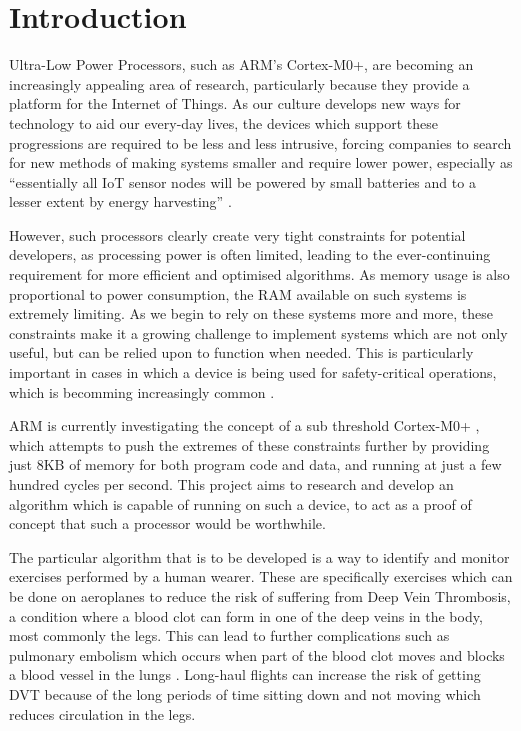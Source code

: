 \chapter{Introduction}

Ultra-Low Power Processors, such as ARM's Cortex-M0+, are becoming an increasingly appealing area of research, particularly because they provide a platform for the Internet of Things. As our culture develops new ways for technology to aid our every-day lives, the devices which support these progressions are required to be less and less intrusive, forcing companies to search for new methods of making systems smaller and require lower power, especially as ``essentially all IoT sensor nodes will be powered by small batteries and to a lesser extent by energy harvesting'' \cite{iot_power}.

However, such processors clearly create very tight constraints for potential developers, as processing power is often limited, leading to the ever-continuing requirement for more efficient and optimised algorithms. As memory usage is also proportional to power consumption, the RAM available on such systems is extremely limiting. As we begin to rely on these systems more and more, these constraints make it a growing challenge to implement systems which are not only useful, but can be relied upon to function when needed. This is particularly important in cases in which a device is being used for safety-critical operations, which is becomming increasingly common \cite{iot_saftey} \cite{iot_saftey2}.

ARM is currently investigating the concept of a sub threshold Cortex-M0+ \cite{arm_sub}, which attempts to push the extremes of these constraints further by providing just 8KB of memory for both program code and data, and running at just a few hundred cycles per second. This project aims to research and develop an algorithm which is capable of running on such a device, to act as a proof of concept that such a processor would be worthwhile.


The particular algorithm that is to be developed is a way to identify and monitor exercises performed by a human wearer. These are specifically exercises which can be done on aeroplanes to reduce the risk of suffering from Deep Vein Thrombosis, a condition where a blood clot can form in one of the deep veins in the body, most commonly the legs. This can lead to further complications such as pulmonary embolism which occurs when part of the blood clot moves and blocks a blood vessel in the lungs \cite{NHS2014DVT}. Long-haul flights can increase the risk of getting DVT because of the long periods of time sitting down and not moving which reduces circulation in the legs.

